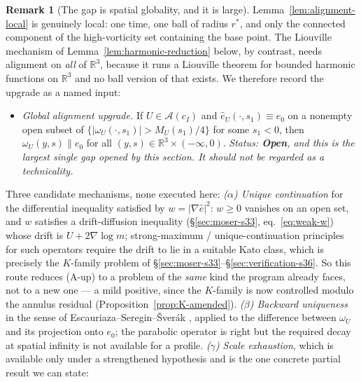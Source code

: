 \documentclass[11pt]{article}
\theoremstyle{definition}
\newtheorem{remark}[theorem]{Remark}
\theoremstyle{remark}
\newcommand{\R}{\mathbb{R}}
\begin{document}
\begin{remark}[The gap is spatial globality, and it is large]
  \label{rem:A-up-discussion}
  Lemma~\ref{lem:alignment-local} is genuinely local: one time, one ball of
  radius $r^*$, and only the connected component of the high-vorticity set
  containing the base point. The Liouville mechanism of
  Lemma~\ref{lem:harmonic-reduction} below, by contrast, needs alignment on
  \emph{all} of $\R^3$, because it runs a Liouville theorem for bounded
  harmonic functions on $\R^3$ and no ball version of that exists. We
  therefore record the upgrade as a named input:
  \begin{itemize}
  \item[\textbf{(A-up)}] \emph{Global alignment upgrade.} If
    $U\in\mathcal{A}(c_I)$ and $\hat e_U(\cdot,s_1)\equiv e_0$ on a
    nonempty open subset of $\{|\omega_U(\cdot,s_1)|>M_U(s_1)/4\}$ for some
    $s_1<0$, then $\omega_U(y,s)\parallel e_0$ for all
    $(y,s)\in\R^3\times(-\infty,0)$.
    \emph{Status: \textbf{Open}, and this is the largest single gap opened by
    this section. It should not be regarded as a technicality.}
  \end{itemize}
  Three candidate mechanisms, none executed here:
  \emph{($\alpha$) Unique continuation} for the differential inequality
  satisfied by $w=|\nabla\hat e|^2$: $w\geq0$ vanishes on an open set, and
  $w$ satisfies a drift-diffusion inequality (\S\ref{sec:moser-s33},
  eq.~\eqref{eq:weak-w}) whose drift is $U+2\nabla\log m$; strong-maximum /
  unique-continuation principles for such operators require the drift to lie
  in a suitable Kato class, which is precisely the $K$-family problem of
  \S\ref{sec:moser-s33}--\S\ref{sec:verification-s36}. So this route reduces
  (A-up) to a problem of the \emph{same} kind the program already faces, not
  to a new one --- a mild positive, since the $K$-family is now controlled
  modulo the annulus residual (Proposition~\ref{prop:K-amended}).
  \emph{($\beta$) Backward uniqueness} in the sense of
  Escauriaza--Seregin--\v{S}ver\'ak \cite{EscauriazaSereginSverak2003},
  applied to the difference between $\omega_U$ and its projection onto
  $e_0$; the parabolic operator is right but the required decay at spatial
  infinity is not available for a profile.
  \emph{($\gamma$) Scale exhaustion}, which is available only under a
  strengthened hypothesis and is the one concrete partial result we can
  state:
\end{remark}
\end{document}
